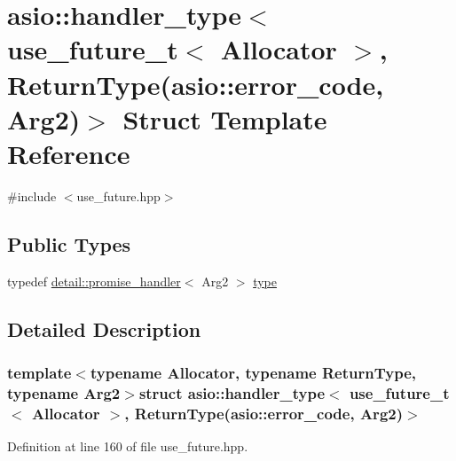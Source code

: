 \hypertarget{structasio_1_1handler__type_3_01use__future__t_3_01_allocator_01_4_00_01_01_01_01_01_01_01_01_01912bb47ba4497b53d32e350e5bfa0a51}{}\section{asio\+:\+:handler\+\_\+type$<$ use\+\_\+future\+\_\+t$<$ Allocator $>$, Return\+Type(asio\+:\+:error\+\_\+code, Arg2)$>$ Struct Template Reference}
\label{structasio_1_1handler__type_3_01use__future__t_3_01_allocator_01_4_00_01_01_01_01_01_01_01_01_01912bb47ba4497b53d32e350e5bfa0a51}


{\ttfamily \#include $<$use\+\_\+future.\+hpp$>$}

\subsection*{Public Types}
\begin{DoxyCompactItemize}
\item 
typedef \hyperlink{classasio_1_1detail_1_1promise__handler}{detail\+::promise\+\_\+handler}$<$ Arg2 $>$ \hyperlink{structasio_1_1handler__type_3_01use__future__t_3_01_allocator_01_4_00_01_01_01_01_01_01_01_01_01912bb47ba4497b53d32e350e5bfa0a51_a77bcd6ab17577d0adf5835708fb32989}{type}
\end{DoxyCompactItemize}


\subsection{Detailed Description}
\subsubsection*{template$<$typename Allocator, typename Return\+Type, typename Arg2$>$struct asio\+::handler\+\_\+type$<$ use\+\_\+future\+\_\+t$<$ Allocator $>$,           Return\+Type(asio\+::error\+\_\+code, Arg2)$>$}



Definition at line 160 of file use\+\_\+future.\+hpp.



